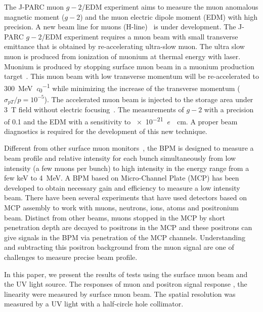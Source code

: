 \documentclass[preprint,3p,twocolumn]{elsarticle}
\begin{document}
The J-PARC muon $g-2$/EDM experiment \cite{E34} aims to measure the muon anomalous magnetic moment ($g-2$) and the muon electric dipole moment (EDM) with high precision.
A new beam line for muons (H-line)~\cite{h-line} is under development.
The J-PARC $g-2$/EDM experiment requires a muon beam with small transverse emittance that is obtained by re-accelerating ultra-slow muon. %
The ultra slow muon is produced from ionization of muonium at thermal energy with laser.
Muonium is produced by stopping surface muon beam in a muonium production target~\cite{muonium}.  
This muon beam with low transverse momentum will be re-accelerated to \SI{300}{\MeV\per\clight} \cite{IH} while minimizing the increase of the transverse momentum ($\sigma_{pT}/p = 10^{-5}$).
The accelerated muon beam is injected to the storage area under \SI{3}{\tesla} field without electric focusing~\cite{injection}. The measurements of $g-2$ with a precision of \SI{0.1}{\ppm} and the EDM with a sensitivity to \SI{e-21}{\elementarycharge \cdot \cm}.  A proper beam diagnostics is required for the development of this new technique. 

Different from other surface muon monitors~\cite{muon_bpm1}, the BPM is designed to measure a beam profile and relative intensity for each bunch simultaneously from low intensity (a few muons per bunch) to high intensity in the energy range from a few \si{keV} to \SI{4}{\MeV}.
A BPM based on Micro-Channel Plate (MCP) has been developed to obtain necessary gain and efficiency to measure a low intensity beam.
There have been several experiments that have used detectors based on MCP assembly to work with muons, neutrons, ions, atoms and positronium~\cite{muon_bpm2, neutron, Ps} beam.
Distinct from other beams, muons stopped in the MCP by short penetration depth are decayed to positrons in the MCP and these positrons can give signals in the BPM via penetration of the MCP channels. 
Understanding and subtracting this positron background from the muon signal are one of challenges to measure precise beam profile. %

In this paper, we present the results of tests using the surface muon beam and the UV light source.
The responses of muon and positron signal response%
, the linearity %
were measured by surface muon beam.
The spatial resolution was measured by a UV light with a half-circle hole collimator.
\end{document}
